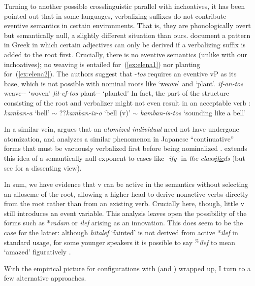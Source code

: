 {Turning to another possible crosslinguistic parallel with inchoatives, it has been pointed out that in some languages, verbalizing suffixes do not contribute eventive semantics in certain environments. That is, they are phonologically overt but semantically null, a slightly different situation than ours. \citet{elenasamioti13,elenasamioti14} document a pattern in Greek in which certain adjectives can only be derived if a verbalizing suffix is added to the root first. Crucially, there is no eventive semantics (unlike with our inchoatives); no weaving is entailed for~(\ref{ex:elena1}) nor planting for~(\ref{ex:elena2}). {The authors suggest that -\emph{tos} requires an eventive vP as its base, which is not possible with nominal roots like `weave' and `plant'.}
\ex \label{ex:elena1} \emph{if-an-tos} weave-- `woven'
\xe
\ex \label{ex:elena2} \emph{fit-ef-tos} plant-- `planted' \hfill \citep[97]{elenasamioti14}
\xe
In fact, the part of the structure consisting of the root and verbalizer might not even result in an acceptable verb \citep[100]{elenasamioti14}:
\ex \emph{kamban-a} `bell' $\sim$ ??\emph{kamban-iz-o} `bell (v)' $\sim$ \emph{kamban-is-tos} `sounding like a bell'
\xe

In a similar vein, \cite{marantz13} argues that an \emph{atomized individual} need not have undergone atomization, and analyzes a similar phenomenon in Japanese ``continuative'' forms that must be vacuously verbalized first{ before being nominalized} \citep{volpe05}. \cite{anagnostopoulou14thli} extends this idea of a semantically null exponent to cases like -\emph{ify}- in \emph{the class\underline{ifie}ds} (but see \citealt{borer14lingua} for a dissenting view).

In sum, we have evidence that v can be active in the semantics without selecting an alloseme of the root, allowing a higher {\vz} head to derive nonactive verbs directly from the root rather than from an existing verb. Crucially here, though, little v still introduces an event variable. This analysis leaves open the possibility of the forms such as *\emph{radam} or \emph{ilef} arising as an innovation. This does seem to be the case for the latter: although \emph{hitalef} `fainted' is not derived from active *\emph{ilef} in standard usage, for some younger speakers it is possible to say $^{\%}$\emph{ilef} to mean `amazed' figuratively \citep{laks14}.

With the empirical picture for configurations with {\vz} (and {\pz}) wrapped up, I turn to a few alternative approaches.

}
